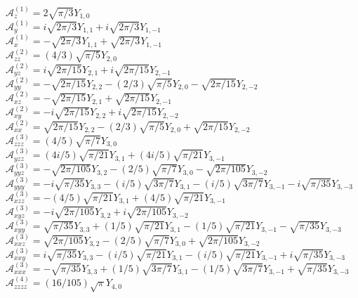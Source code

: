 \documentclass{article}
\begin{document}
${\mathcal A}^{(1)}_{z} =
2\sqrt{\pi/3}Y_{1,0}$\\
${\mathcal A}^{(1)}_{y} =
i\sqrt{2\pi/3}Y_{1,1}
 +i\sqrt{2\pi/3}Y_{1,-1}$\\
${\mathcal A}^{(1)}_{x} =
 -\sqrt{2\pi/3}Y_{1,1}
 +\sqrt{2\pi/3}Y_{1,-1}$\\
${\mathcal A}^{(2)}_{zz} =
(4/3)\sqrt{\pi/5}Y_{2,0}$\\
${\mathcal A}^{(2)}_{yz} =
i\sqrt{2\pi/15}Y_{2,1}
 +i\sqrt{2\pi/15}Y_{2,-1}$\\
${\mathcal A}^{(2)}_{yy} =
 -\sqrt{2\pi/15}Y_{2,2}
 -(2/3)\sqrt{\pi/5}Y_{2,0}
 -\sqrt{2\pi/15}Y_{2,-2}$\\
${\mathcal A}^{(2)}_{xz} =
 -\sqrt{2\pi/15}Y_{2,1}
 +\sqrt{2\pi/15}Y_{2,-1}$\\
${\mathcal A}^{(2)}_{xy} =
 -i\sqrt{2\pi/15}Y_{2,2}
 +i\sqrt{2\pi/15}Y_{2,-2}$\\
${\mathcal A}^{(2)}_{xx} =
\sqrt{2\pi/15}Y_{2,2}
 -(2/3)\sqrt{\pi/5}Y_{2,0}
 +\sqrt{2\pi/15}Y_{2,-2}$\\
${\mathcal A}^{(3)}_{zzz} =
(4/5)\sqrt{\pi/7}Y_{3,0}$\\
${\mathcal A}^{(3)}_{yzz} =
(4i/5)\sqrt{\pi/21}Y_{3,1}
 +(4i/5)\sqrt{\pi/21}Y_{3,-1}$\\
${\mathcal A}^{(3)}_{yyz} =
 -\sqrt{2\pi/105}Y_{3,2}
 -(2/5)\sqrt{\pi/7}Y_{3,0}
 -\sqrt{2\pi/105}Y_{3,-2}$\\
${\mathcal A}^{(3)}_{yyy} =
 -i\sqrt{\pi/35}Y_{3,3}
 -(i/5)\sqrt{3\pi/7}Y_{3,1}
 -(i/5)\sqrt{3\pi/7}Y_{3,-1}
 -i\sqrt{\pi/35}Y_{3,-3}$\\
${\mathcal A}^{(3)}_{xzz} =
 -(4/5)\sqrt{\pi/21}Y_{3,1}
 +(4/5)\sqrt{\pi/21}Y_{3,-1}$\\
${\mathcal A}^{(3)}_{xyz} =
 -i\sqrt{2\pi/105}Y_{3,2}
 +i\sqrt{2\pi/105}Y_{3,-2}$\\
${\mathcal A}^{(3)}_{xyy} =
\sqrt{\pi/35}Y_{3,3}
 +(1/5)\sqrt{\pi/21}Y_{3,1}
 -(1/5)\sqrt{\pi/21}Y_{3,-1}
 -\sqrt{\pi/35}Y_{3,-3}$\\
${\mathcal A}^{(3)}_{xxz} =
\sqrt{2\pi/105}Y_{3,2}
 -(2/5)\sqrt{\pi/7}Y_{3,0}
 +\sqrt{2\pi/105}Y_{3,-2}$\\
${\mathcal A}^{(3)}_{xxy} =
i\sqrt{\pi/35}Y_{3,3}
 -(i/5)\sqrt{\pi/21}Y_{3,1}
 -(i/5)\sqrt{\pi/21}Y_{3,-1}
 +i\sqrt{\pi/35}Y_{3,-3}$\\
${\mathcal A}^{(3)}_{xxx} =
 -\sqrt{\pi/35}Y_{3,3}
 +(1/5)\sqrt{3\pi/7}Y_{3,1}
 -(1/5)\sqrt{3\pi/7}Y_{3,-1}
 +\sqrt{\pi/35}Y_{3,-3}$\\
${\mathcal A}^{(4)}_{zzzz} =
(16/105)\sqrt{\pi}Y_{4,0}$\\
\end{document}
